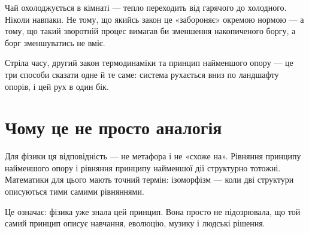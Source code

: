 \documentclass[12pt, a4paper, openany]{book}
\begin{document}
\begin{analogybox}
Чай охолоджується в кімнаті --- тепло переходить від гарячого до холодного. Ніколи навпаки. Не тому, що якийсь закон це «забороняє» окремою нормою --- а тому, що такий зворотній процес вимагав би зменшення накопиченого боргу, а борг зменшуватись не вміє.
\end{analogybox}

Стріла часу, другий закон термодинаміки та принцип найменшого опору --- це три способи сказати одне й те саме: система рухається вниз по ландшафту опорів, і цей рух в один бік.

\section{Чому це не просто аналогія}

Для фізики ця відповідність --- не метафора і не «схоже на». Рівняння принципу найменшого опору і рівняння принципу найменшої дії структурно тотожні. Математики для цього мають точний термін: ізоморфізм --- коли дві структури описуються тими самими рівняннями.

Це означає: фізика уже знала цей принцип. Вона просто не підозрювала, що той самий принцип описує навчання, еволюцію, музику і людські рішення.
\end{document}
